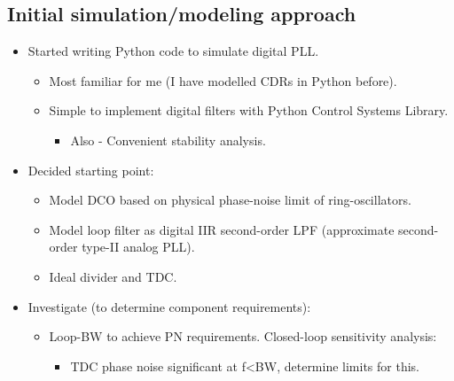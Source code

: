 \documentclass[10pt,a4paper]{article}
\begin{document}
		\subsection{Initial simulation/modeling approach}
		\vspace{-.2em}
		\begin{itemize}
			\footnotesize
			\item Started writing Python code to simulate digital PLL.
			\begin{itemize}
				\footnotesize
				\item Most familiar for me (I have modelled CDRs in Python before).
				\item Simple to implement digital filters with Python Control Systems Library.
				\begin{itemize}
					\scriptsize
					\item Also - Convenient stability analysis.
				\end{itemize}
			\end{itemize}
			\footnotesize
			\item Decided starting point:
			\begin{itemize}
				\footnotesize
				\item Model DCO based on physical phase-noise limit of ring-oscillators. 
				\item Model loop filter as digital IIR second-order LPF (approximate second-order type-II analog PLL).
				\item Ideal divider and TDC.
			\end{itemize} 
			\item Investigate (to determine component requirements):
			\begin{itemize}
				\footnotesize
				\item Loop-BW to achieve PN requirements. Closed-loop sensitivity analysis:
				\begin{itemize}
					\scriptsize
					\item TDC phase noise significant at f<BW, determine limits for this. 
				\end{itemize}
			\end{itemize}
		\end{itemize}    
\end{document}
